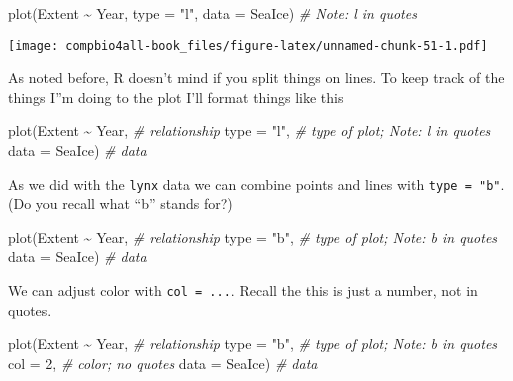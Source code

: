 \documentclass[
]{book}
\newenvironment{Shaded}{\begin{snugshade}}{\end{snugshade}}
\newcommand{\AttributeTok}[1]{\textcolor[rgb]{0.77,0.63,0.00}{#1}}
\newcommand{\CommentTok}[1]{\textcolor[rgb]{0.56,0.35,0.01}{\textit{#1}}}
\newcommand{\DecValTok}[1]{\textcolor[rgb]{0.00,0.00,0.81}{#1}}
\newcommand{\FunctionTok}[1]{\textcolor[rgb]{0.00,0.00,0.00}{#1}}
\newcommand{\NormalTok}[1]{#1}
\newcommand{\SpecialCharTok}[1]{\textcolor[rgb]{0.00,0.00,0.00}{#1}}
\newcommand{\StringTok}[1]{\textcolor[rgb]{0.31,0.60,0.02}{#1}}
\begin{document}
\begin{Shaded}
\begin{Highlighting}[]
\FunctionTok{plot}\NormalTok{(Extent }\SpecialCharTok{\textasciitilde{}}\NormalTok{ Year, }\AttributeTok{type =} \StringTok{"l"}\NormalTok{, }\AttributeTok{data =}\NormalTok{ SeaIce)  }\CommentTok{\# Note: l in quotes}
\end{Highlighting}
\end{Shaded}

\texttt{[image: compbio4all-book\_files/figure-latex/unnamed-chunk-51-1.pdf]}

As noted before, R doesn't mind if you split things on lines. To keep track of the things I''m doing to the plot I'll format things like this

\begin{Shaded}
\begin{Highlighting}[]
\FunctionTok{plot}\NormalTok{(Extent }\SpecialCharTok{\textasciitilde{}}\NormalTok{ Year,  }\CommentTok{\# relationship}
     \AttributeTok{type =} \StringTok{"l"}\NormalTok{,     }\CommentTok{\# type of plot; Note: l in quotes}
     \AttributeTok{data =}\NormalTok{ SeaIce)  }\CommentTok{\# data}
\end{Highlighting}
\end{Shaded}

As we did with the \texttt{lynx} data we can combine points and lines with \texttt{type\ =\ "b"}. (Do you recall what ``b'' stands for?)

\begin{Shaded}
\begin{Highlighting}[]
\FunctionTok{plot}\NormalTok{(Extent }\SpecialCharTok{\textasciitilde{}}\NormalTok{ Year,  }\CommentTok{\# relationship}
     \AttributeTok{type =} \StringTok{"b"}\NormalTok{,     }\CommentTok{\# type of plot; Note: b in quotes}
     \AttributeTok{data =}\NormalTok{ SeaIce)  }\CommentTok{\# data}
\end{Highlighting}
\end{Shaded}

We can adjust color with \texttt{col\ =\ ...}. Recall the this is just a number, not in quotes.

\begin{Shaded}
\begin{Highlighting}[]
\FunctionTok{plot}\NormalTok{(Extent }\SpecialCharTok{\textasciitilde{}}\NormalTok{ Year,  }\CommentTok{\# relationship}
     \AttributeTok{type =} \StringTok{"b"}\NormalTok{,     }\CommentTok{\# type of plot; Note: b in quotes}
     \AttributeTok{col =} \DecValTok{2}\NormalTok{,        }\CommentTok{\# color; no quotes}
     \AttributeTok{data =}\NormalTok{ SeaIce)  }\CommentTok{\# data}
\end{Highlighting}
\end{Shaded}
\end{document}
